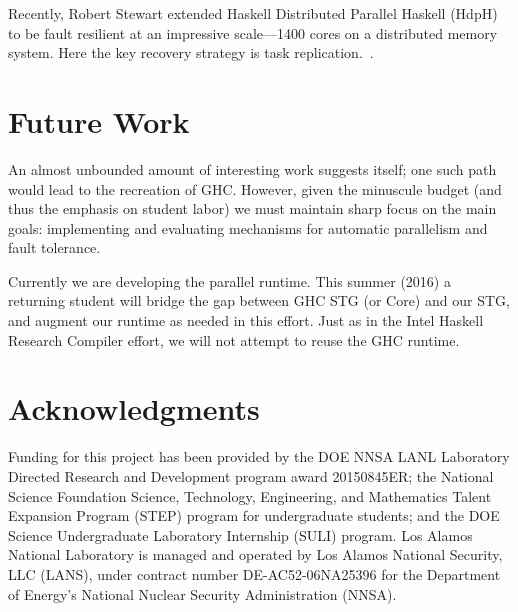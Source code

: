 \documentclass{llncs}
\begin{document}
Recently, Robert Stewart extended Haskell Distributed Parallel Haskell
(HdpH)~\cite{hdph} to be fault resilient at an impressive scale---1400 cores
on a distributed memory system.  Here the key recovery strategy is task
replication.~\cite{Stewart:2013}.

\section{Future Work}

An almost unbounded amount of interesting work suggests itself; one such path
would lead to the recreation of GHC.  However, given the minuscule budget (and
thus the emphasis on student labor) we must maintain sharp focus on the main
goals:  implementing and evaluating mechanisms for automatic parallelism and
fault tolerance.

Currently we are developing the parallel runtime.  This summer (2016) a
returning student will bridge the gap between GHC STG (or Core) and our STG,
and augment our runtime as needed in this effort.  Just as in the Intel
Haskell Research Compiler effort, we will not attempt to reuse the GHC
runtime.

\section{Acknowledgments}

Funding for this project has been provided by the DOE NNSA LANL Laboratory
Directed Research and Development program award 20150845ER; the National
Science Foundation Science, Technology, Engineering, and Mathematics Talent
Expansion Program (STEP) program for undergraduate students; and the DOE
Science Undergraduate Laboratory Internship (SULI) program.
%
Los Alamos National Laboratory is managed and operated by Los Alamos National
Security, LLC (LANS), under contract number DE-AC52-06NA25396 for the
Department of Energy’s National Nuclear Security Administration (NNSA).


%
%




\end{document}
